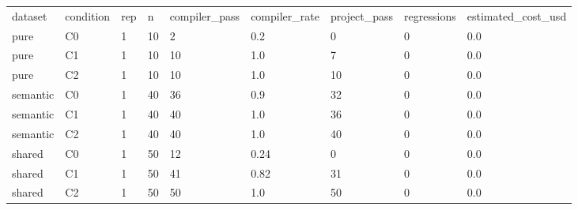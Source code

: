 \begin{tabular}{lllllllll}
dataset & condition & rep & n & compiler\_pass & compiler\_rate & project\_pass & regressions & estimated\_cost\_usd \\
pure & C0 & 1 & 10 & 2 & 0.2 & 0 & 0 & 0.0 \\
pure & C1 & 1 & 10 & 10 & 1.0 & 7 & 0 & 0.0 \\
pure & C2 & 1 & 10 & 10 & 1.0 & 10 & 0 & 0.0 \\
semantic & C0 & 1 & 40 & 36 & 0.9 & 32 & 0 & 0.0 \\
semantic & C1 & 1 & 40 & 40 & 1.0 & 36 & 0 & 0.0 \\
semantic & C2 & 1 & 40 & 40 & 1.0 & 40 & 0 & 0.0 \\
shared & C0 & 1 & 50 & 12 & 0.24 & 0 & 0 & 0.0 \\
shared & C1 & 1 & 50 & 41 & 0.82 & 31 & 0 & 0.0 \\
shared & C2 & 1 & 50 & 50 & 1.0 & 50 & 0 & 0.0 \\
\end{tabular}